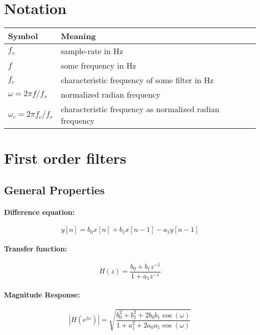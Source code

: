 \section{Notation}

\begin{center}
\begin{tabular}{|l|l|}
 \hline
 Symbol                        & Meaning                                                  \\
 \hline
 $f_s$                         &  sample-rate in Hz                                       \\   
 $f$                           &  some frequency in Hz                                    \\   
 $f_c$                         &  characteristic frequency of some filter in Hz           \\   
 $\omega = 2 \pi f / f_s$      &  normalized radian frequency                             \\   
 $\omega_c = 2 \pi f_c / f_s$  & characteristic frequency as normalized radian frequency  \\    
 \hline
\end{tabular}
\end{center}

\section{First order filters}

\subsection{General Properties}

\paragraph{Difference equation:}
\begin{equation}
 y[n] = b_0 x[n] + b_1 x[n-1] - a_1 y[n-1]
\end{equation}

\paragraph{Transfer function:}
\begin{equation}
 H(z) = \frac{ b_0 + b_1 z^{-1} } { 1 + a_1 z^{-1}  }
\end{equation}

\paragraph{Magnitude Response:}
\begin{equation}
 |H(e^{j \omega})| = \sqrt{ \frac{ b_0^2 + b_1^2 + 2b_0 b_1 \cos(\omega) } { 1 + a_1^2 + 2a_0 a_1 \cos(\omega) } }
\end{equation}

